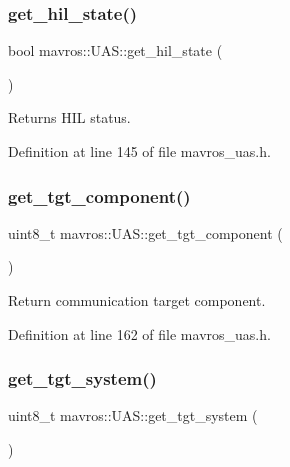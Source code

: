 \subsubsection{\texorpdfstring{get\_hil\_state()}{get\_hil\_state()}}
{\footnotesize\ttfamily bool mavros\+::\+U\+A\+S\+::get\+\_\+hil\+\_\+state (\begin{DoxyParamCaption}{ }\end{DoxyParamCaption})\hspace{0.3cm}{\ttfamily [inline]}}



Returns H\+IL status. 



Definition at line 145 of file mavros\+\_\+uas.\+h.

\mbox{\label{group__nodelib_ga1b874777bb6378d1fec2d3498f95884c}} 
\subsubsection{\texorpdfstring{get\_tgt\_component()}{get\_tgt\_component()}}
{\footnotesize\ttfamily uint8\+\_\+t mavros\+::\+U\+A\+S\+::get\+\_\+tgt\+\_\+component (\begin{DoxyParamCaption}{ }\end{DoxyParamCaption})\hspace{0.3cm}{\ttfamily [inline]}}



Return communication target component. 



Definition at line 162 of file mavros\+\_\+uas.\+h.

\mbox{\label{group__nodelib_ga9d8412c7b6aada6715ded8eefcd6a517}} 
\subsubsection{\texorpdfstring{get\_tgt\_system()}{get\_tgt\_system()}}
{\footnotesize\ttfamily uint8\+\_\+t mavros\+::\+U\+A\+S\+::get\+\_\+tgt\+\_\+system (\begin{DoxyParamCaption}{ }\end{DoxyParamCaption})\hspace{0.3cm}{\ttfamily [inline]}}



